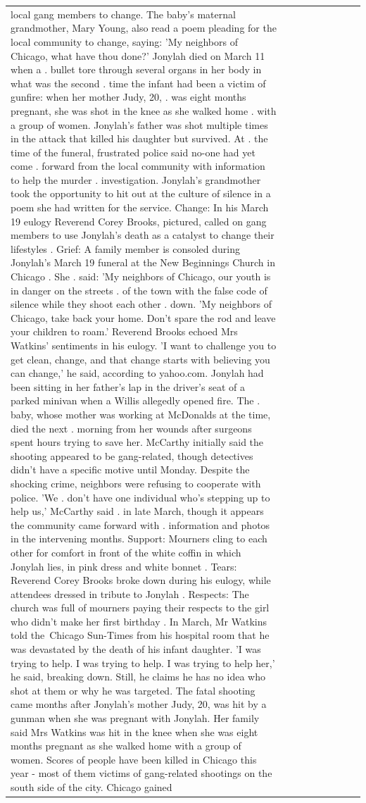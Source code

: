 \begin{table}[H]
\begin{tabular}{lllrlllll}
local gang members to change. The baby's maternal grandmother, Mary Young, also read a poem pleading for the local community to change, saying: 'My neighbors of Chicago, what have thou done?' Jonylah died on March 11 when a . bullet tore through several organs in her body in what was the second . time the infant had been a victim of gunfire: when her mother Judy, 20, . was eight months pregnant, she was shot in the knee as she walked home . with a group of women. Jonylah's father was shot multiple times in the attack that killed his daughter but survived. At . the time of the funeral, frustrated police said no-one had yet come . forward from the local community with information to help the murder . investigation. Jonylah's grandmother took the opportunity to hit out at the culture of silence in a poem she had written for the service. Change: In his March 19 eulogy Reverend Corey Brooks, pictured, called on gang members to use Jonylah's death as a catalyst to change their lifestyles . Grief: A family member is consoled during Jonylah's March 19 funeral at the New Beginnings Church in Chicago . She . said: 'My neighbors of Chicago, our youth is in danger on the streets . of the town with the false code of silence while they shoot each other . down. 'My neighbors of Chicago, take back your home. Don't spare the rod and leave your children to roam.' Reverend Brooks echoed Mrs Watkins' sentiments in his eulogy. 'I want to challenge you to get clean, change, and that change starts with believing you can change,' he said, according to yahoo.com. Jonylah had been sitting in her father's lap in the driver's seat of a parked minivan when a Willis allegedly opened fire. The . baby, whose mother was working at McDonalds at the time, died the next . morning from her wounds after surgeons spent hours trying to save her. McCarthy initially said the shooting appeared to be gang-related, though detectives didn't have a specific motive until Monday. Despite the shocking crime, neighbors were refusing to cooperate with police. 'We . don't have one individual who's stepping up to help us,' McCarthy said . in late March, though it appears the community came forward with . information and photos in the intervening months. Support: Mourners cling to each other for comfort in front of the white coffin in which Jonylah lies, in pink dress and white bonnet . Tears: Reverend Corey Brooks broke down during his eulogy, while attendees dressed in tribute to Jonylah . Respects: The church was full of mourners paying their respects to the girl who didn't make her first birthday . In March, Mr Watkins told the Chicago Sun-Times from his hospital room that he was devastated by the death of his infant daughter. 'I was trying to help. I was trying to help. I was trying to help her,' he said, breaking down. Still, he claims he has no idea who shot at them or why he was targeted. The fatal shooting came months after Jonylah's mother Judy, 20, was hit by a gunman when she was pregnant with Jonylah. Her family said Mrs Watkins was hit in the knee when she was eight months pregnant as she walked home with a group of women. Scores of people have been killed in Chicago this year - most of them victims of gang-related shootings on the south side of the city. Chicago gained 
\end{tabular}
\end{table}
